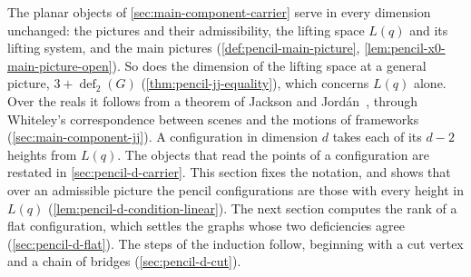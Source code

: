 The planar objects of \cref{sec:main-component-carrier} serve in every
dimension unchanged: the pictures and their admissibility, the lifting
space $L(q)$ and its lifting system, and the main pictures
(\cref{def:pencil-main-picture}, \cref{lem:pencil-x0-main-picture-open}).
So does the dimension of the lifting space at a general picture,
$3 + \operatorname{def}_2(G)$ (\cref{thm:pencil-jj-equality}), which
concerns $L(q)$ alone. Over the reals it follows from a theorem of
Jackson and Jord\'an~\cite[Theorem~7.1]{jacksonJordan2006pin}, through
Whiteley's correspondence between scenes and the motions of
frameworks~\cite{whiteley1984} (\cref{sec:main-component-jj}).
A configuration in dimension $d$ takes each
of its $d - 2$ heights from $L(q)$. The objects that read the points of
a configuration are restated in \cref{sec:pencil-d-carrier}. This
section fixes the notation, and shows that over an admissible picture
the pencil configurations are those with every height in $L(q)$
(\cref{lem:pencil-d-condition-linear}). The next section computes the
rank of a flat configuration, which settles the graphs whose two
deficiencies agree (\cref{sec:pencil-d-flat}). The steps of the
induction follow, beginning with a cut vertex and a chain of bridges
(\cref{sec:pencil-d-cut}).

